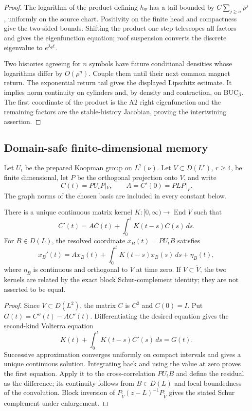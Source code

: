 \begin{proof}
The logarithm of the product defining \(h_\Psi\) has a tail bounded by
\(C\sum_{j\ge n}\rho^j\), uniformly on the source chart.  Positivity on the
finite head and compactness give the two-sided bounds.  Shifting the product
one step telescopes all factors and gives the eigenfunction equation; roof
suspension converts the discrete eigenvalue to \(e^{\lambda_\Psi t}\).

Two histories agreeing for \(n\) symbols have future conditional densities
whose logarithms differ by \(O(\rho^n)\).  Couple them until their next common
magnet return.  The exponential return tail gives the displayed Lipschitz
estimate.  It implies norm continuity on cylinders and, by density and
contraction, on \(\mathrm{BUC}_\beta\).  The first coordinate of the product is
the A2 right eigenfunction and the remaining factors are the stable-history
Jacobian, proving the intertwining assertion.
\end{proof}

\subsection{Domain-safe finite-dimensional memory}

Let \(U_t\) be the prepared Koopman group on \(L^2(\nu)\).  Let
\(V\subset D(L^r)\), \(r\ge4\), be finite dimensional, let \(P\) be the
orthogonal projection onto \(V\), and write
\[
 C(t)=PU_tP|_V,\qquad A=C'(0)=PLP|_V.
\]
The graph norms of the chosen basis are included in every constant below.

\begin{theorem}
\label{thm:r5-a4-volterra}
There is a unique continuous matrix kernel \(K:[0,\infty)\to\operatorname{End}V\)
such that
\[
 C'(t)=AC(t)+\int_0^tK(t-s)C(s)\,ds.
\]
For \(B\in D(L)\), the resolved coordinate
\(x_B(t)=PU_tB\) satisfies
\[
 x_B'(t)=Ax_B(t)+\int_0^tK(t-s)x_B(s)\,ds+\eta_B(t),
\]
where \(\eta_B\) is continuous and orthogonal to \(V\) at time zero.  If
\(V\subset\widetilde V\), the two kernels are related by the exact block
Schur-complement identity; they are not asserted to be equal.
\end{theorem}

\begin{proof}
Since \(V\subset D(L^2)\), the matrix \(C\) is \(C^2\) and \(C(0)=I\).
Put \(G(t)=C''(t)-AC'(t)\).  Differentiating the desired equation gives the
second-kind Volterra equation
\[
 K(t)+\int_0^tK(t-s)C'(s)\,ds=G(t).
\]
Successive approximation converges uniformly on compact intervals and gives a
unique continuous solution.  Integrating back and using the value at zero
proves the first equation.  Apply it to the cross-correlation
\(PU_tB\) and define the residual as the difference; its continuity follows
from \(B\in D(L)\) and local boundedness of the convolution.  Block inversion
of \(P_{\widetilde V}(z-L)^{-1}P_{\widetilde V}\) gives the stated Schur
complement under enlargement.
\end{proof}

